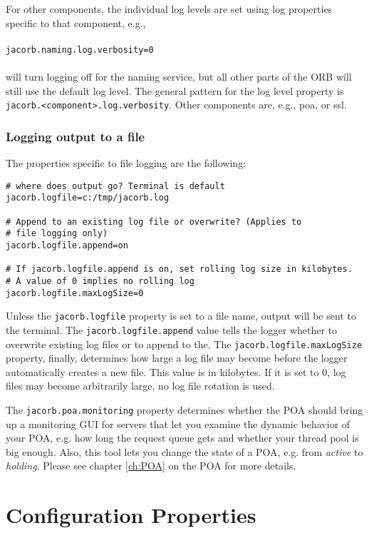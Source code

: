 For other components, the individual log levels are set using log
properties specific to that component, e.g.,\\
\\
{\tt jacorb.naming.log.verbosity=0}\\
\\
will turn logging off for the naming service, but all other parts of
the ORB will still use the default log level. The general pattern for
the log level property is {\tt jacorb.<component>.log.verbosity}.
Other components are, e.g., poa, or ssl.

\subsubsection*{Logging output to a file}

The properties specific to file logging are the following:

\renewcommand{\baselinestretch}{0.9}
\small{
\begin{verbatim}
# where does output go? Terminal is default
jacorb.logfile=c:/tmp/jacorb.log

# Append to an existing log file or overwrite? (Applies to
# file logging only)
jacorb.logfile.append=on

# If jacorb.logfile.append is on, set rolling log size in kilobytes.
# A value of 0 implies no rolling log
jacorb.logfile.maxLogSize=0
\end{verbatim}
}
\renewcommand{\baselinestretch}{1.0}
\small\normalsize

Unless the {\tt jacorb.logfile} property is set to a file name, output
will be sent to the terminal. The {\tt jacorb.logfile.append} value
tells the logger whether to overwrite existing log files or to append
to the. The {\tt jacorb.logfile.maxLogSize} property, finally,
determines how large a log file may become before the logger
automatically creates a new file. This value is in kilobytes. If it is
set to 0, log files may become arbitrarily large, no log file rotation
is used.

The  {\tt jacorb.poa.monitoring} property  determines whether  the POA
should bring up a monitoring GUI  for servers that let you examine the
dynamic behavior of  your POA, e.g.  how long  the request queue gets
and whether your thread pool is  big enough.  Also, this tool lets you
change the  state of a POA,  e.g. from {\it active}  to {\it holding}.
Please see chapter \ref{ch:POA} on the POA for more details.


\section{Configuration Properties}

